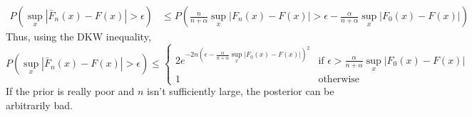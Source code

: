 \documentclass[11pt]{article}
\theoremstyle{definition}
\begin{document}
\begin{itemize}
\begin{align*}
                        P\left(\sup_x\left\vert \bar F_n(x)-F(x)\right\vert>\epsilon\right) &\leq P\left(\frac{n}{n+\alpha}\sup_x\left\vert F_n(x)-F(x)\right\vert>\epsilon - \frac{\alpha}{n+\alpha}\sup_x\left\vert F_0(x)-F(x)\right\vert\right)
                    \end{align*}
                    Thus, using the DKW inequality,
                    \[ P\left(\sup_x\left\vert \bar F_n(x)-F(x)\right\vert>\epsilon\right)\leq 
                        \begin{cases}
                            2e^{-2n\left(\epsilon - \frac{\alpha}{n+\alpha}\sup_x\left\vert F_0(x)-F(x)\right\vert \right)^2} & \text{if } \epsilon > \frac{\alpha}{n+\alpha}\sup_x\left\vert F_0(x)-F(x)\right\vert \\
                            1 & \text{otherwise}
                        \end{cases}
                    \]
                    If the prior is really poor and $n$ isn't sufficiently large, the posterior can be arbitrarily bad.
        
        
                    

        

        
\end{itemize}
\end{document}
